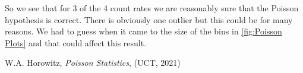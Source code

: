 \documentclass[12pt]{article}
\numberwithin{equation}{section}
\numberwithin{figure}{section}
\numberwithin{table}{section}
\begin{document}
\par So we see that for 3 of the 4 count rates we are reasonably sure that the Poisson hypothesis is correct. There is obviously one outlier but this could be for many reasons. We had to guess when it came to the size of the bins in \autoref{fig:Poisson Plots} and that could affect this result. 




\newpage
\begin{thebibliography}{9}
    W.A. Horowitz, \textit{Poisson Statistics}, (UCT, 2021)

\end{thebibliography}
\end{document}
